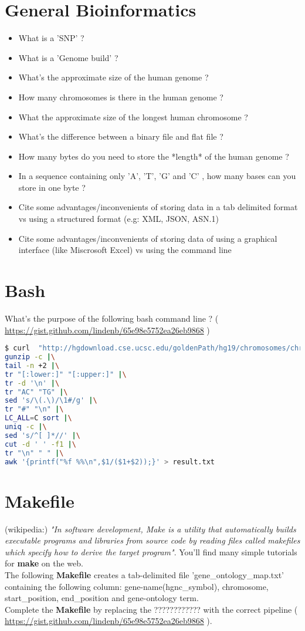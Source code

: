 \documentclass{article}
\begin{document}
\section{General Bioinformatics}
\begin{itemize}
\item What is a 'SNP' ? 
\item What is a 'Genome build' ?
\item What's the approximate size of the human genome ?
\item How many chromosomes is there in the human genome ?
\item What the approximate size of the longest human chromosome ?
\item What's the difference between a binary file and flat file ?
\item How many bytes do you need to store the *length* of the human genome ?
\item In a sequence containing only 'A', 'T', 'G' and 'C' , how many bases can you store in one byte ?
\item Cite some advantages/inconvenients of storing data in a tab delimited format vs using a structured format (e.g: XML, JSON, ASN.1)
\item Cite some advantages/inconvenients of storing data of using a graphical interface (like Miscrosoft Excel) vs using the command line 
\end{itemize}

\section{Bash}
\noindent
What's the purpose of the following bash command line ? ( \url{https://gist.github.com/lindenb/65e98e5752ea26eb9868} )

\begin{lstlisting}[language=bash]
$ curl  "http://hgdownload.cse.ucsc.edu/goldenPath/hg19/chromosomes/chrM.fa.gz" |\
gunzip -c |\
tail -n +2 |\
tr "[:lower:]" "[:upper:]" |\
tr -d '\n' |\
tr "AC" "TG" |\
sed 's/\(.\)/\1#/g' |\
tr "#" "\n" |\
LC_ALL=C sort |\
uniq -c |\
sed 's/^[ ]*//' |\
cut -d ' ' -f1 |\
tr "\n" " " |\
awk '{printf("%f %%\n",$1/($1+$2));}' > result.txt
\end{lstlisting}

\section{Makefile}
\noindent
(wikipedia:) \emph{"In software development, Make is a utility that automatically builds executable programs and libraries from source code by reading files called makefiles which specify how to derive the target program"}. You'll find many simple tutorials for \textbf{make} on the web.\\
The following \textbf{Makefile} creates a tab-delimited file 'gene\_ontology\_map.txt' containing the following column: gene-name(hgnc\_symbol), chromosome, start\_position, end\_position and gene-ontology term.\\
Complete the \textbf{Makefile} by replacing the ???????????? with the correct pipeline ( \url{https://gist.github.com/lindenb/65e98e5752ea26eb9868} ).
\end{document}
